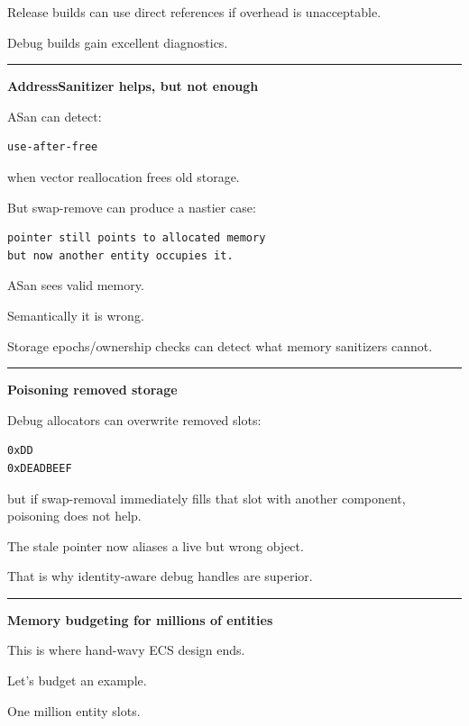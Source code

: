 Release builds can use direct references if overhead is unacceptable.

Debug builds gain excellent diagnostics.

\begin{center}\rule{0.5\linewidth}{0.5pt}\end{center}

\textbf{AddressSanitizer helps, but not enough}

ASan can detect:

\begin{verbatim}
use-after-free
\end{verbatim}

when vector reallocation frees old storage.

But swap-remove can produce a nastier case:

\begin{verbatim}
pointer still points to allocated memory
but now another entity occupies it.
\end{verbatim}

ASan sees valid memory.

Semantically it is wrong.

Storage epochs/ownership checks can detect what memory sanitizers cannot.

\begin{center}\rule{0.5\linewidth}{0.5pt}\end{center}

\textbf{Poisoning removed storage}

Debug allocators can overwrite removed slots:

\begin{verbatim}
0xDD
0xDEADBEEF
\end{verbatim}

but if swap-removal immediately fills that slot with another component, poisoning does not help.

The stale pointer now aliases a live but wrong object.

That is why identity-aware debug handles are superior.

\begin{center}\rule{0.5\linewidth}{0.5pt}\end{center}

\textbf{Memory budgeting for millions of entities}

This is where hand-wavy ECS design ends.

Let's budget an example.

One million entity slots.

